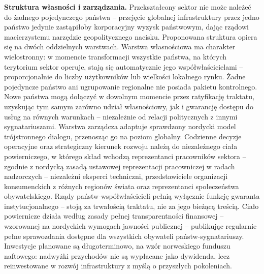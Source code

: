 \documentclass[12pt,a4paper]{article}
\begin{document}
\textbf{Struktura własności i zarządzania.} Przekształcony sektor nie
może należeć do żadnego pojedynczego państwa -- przejęcie globalnej
infrastruktury przez jedno państwo jedynie zastąpiłoby korporacyjny wyzysk
państwowym, dając rządowi macierzystemu narzędzie geopolitycznego nacisku.
Proponowana struktura opiera się na dwóch oddzielnych warstwach. Warstwa
własnościowa ma charakter wielostronny: w momencie transformacji wszystkie
państwa, na których terytorium sektor operuje, stają się automatycznie
jego współwłaścicielami -- proporcjonalnie do liczby użytkowników lub
wielkości lokalnego rynku. Żadne pojedyncze państwo ani ugrupowanie
regionalne nie posiada pakietu kontrolnego. Nowe państwa mogą dołączyć
w dowolnym momencie przez ratyfikację traktatu, uzyskując tym samym
zarówno udział własnościowy, jak i gwarancję dostępu do usług na równych
warunkach -- niezależnie od relacji politycznych z innymi sygnatariuszami.
Warstwa zarządcza adaptuje sprawdzony nordycki model trójstronnego dialogu,
przenosząc go na poziom globalny. Codzienne decyzje operacyjne oraz
strategiczny kierunek rozwoju należą do niezależnego ciała powierniczego,
w którego skład wchodzą reprezentanci pracowników sektora -- zgodnie z
nordycką zasadą ustawowej reprezentacji pracowniczej w radach nadzorczych
-- niezależni eksperci techniczni, przedstawiciele organizacji konsumenckich
z różnych regionów świata oraz reprezentanci społeczeństwa obywatelskiego.
Rządy państw-współwłaścicieli pełnią wyłącznie funkcję gwaranta
instytucjonalnego -- stoją za trwałością traktatu, nie za jego bieżącą
treścią. Ciało powiernicze działa według zasady pełnej transparentności
finansowej -- wzorowanej na nordyckich wymogach jawności publicznej --
publikując regularnie pełne sprawozdania dostępne dla wszystkich obywateli
państw-sygnatariuszy. Inwestycje planowane są długoterminowo, na wzór
norweskiego funduszu naftowego: nadwyżki przychodów nie są wypłacane
jako dywidenda, lecz reinwestowane w rozwój infrastruktury z myślą o
przyszłych pokoleniach.
\end{document}
